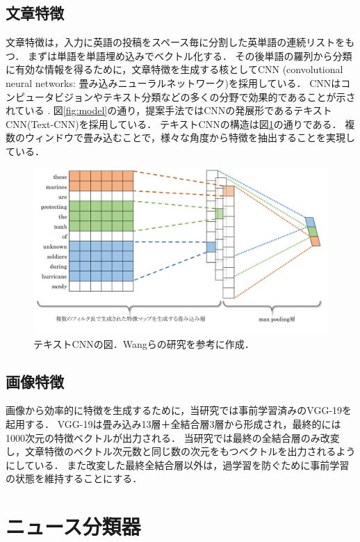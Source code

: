 \subsection{文章特徴}
文章特徴は，入力に英語の投稿をスペース毎に分割した英単語の連続リストをもつ．
まずは単語を単語埋め込みでベクトル化する．
その後単語の羅列から分類に有効な情報を得るために，文章特徴を生成する核としてCNN
(convolutional neural networks: 畳み込みニューラルネットワーク)を採用している．
CNNはコンピュータビジョンやテキスト分類などの多くの分野で効果的であることが示されている
\cite{collobert2011natural,kalchbrenner2014convolutional}.
図\ref{fig:model}の通り，提案手法ではCNNの発展形であるテキストCNN(Text-CNN)\cite{kim2014convolutional}を採用している．
テキストCNNの構造は図\ref{fig:text-cnn}の通りである．
複数のウィンドウで畳み込むことで，様々な角度から特徴を抽出することを実現している．
\begin{figure}[h]
    \centering
    \includegraphics[width=\linewidth]{images/text-cnn.pdf}
    \caption{テキストCNNの図．Wangらの研究\cite{wang2018eann}を参考に作成．}
    \label{fig:text-cnn}
\end{figure}
%
\subsection{画像特徴}
画像から効率的に特徴を生成するために，当研究では事前学習済みのVGG-19\cite{simonyan2014very}を起用する．
VGG-19は畳み込み13層＋全結合層3層から形成され，最終的には1000次元の特徴ベクトルが出力される．
当研究では最終の全結合層のみ改変し，文章特徴のベクトル次元数と同じ数の次元をもつベクトルを出力されるようにしている．
また改変した最終全結合層以外は，過学習を防ぐために事前学習の状態を維持することにする．
%
\section{ニュース分類器}
%




%
%
\newpage
%
%
%
%
%
%
%
%
%
%
% 